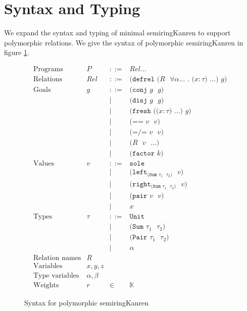 \documentclass{report}
\theoremstyle{definition}
\begin{document}
\section{Syntax and Typing}

We expand the syntax and typing of minimal semiringKanren to support polymorphic relations.
We give the syntax of polymorphic semiringKanren in figure \ref{fig:poly-syntax}.

\begin{figure}
\[
\begin{array}{lrcl}
	\textrm{Programs} & P & ::= & \mathit{Rel}\dots \\
	\textrm{Relations} & Rel & ::= & \texttt{(defrel (\(R\) \(\forall \alpha \dots\) . (\(x:\tau\)) \(\dots\)) \(g\)) } \\
	\textrm{Goals} & g & ::= & \texttt{(conj \(g\) \(g\))} \\
	& & | & \texttt{(disj \(g\) \(g\))} \\
	& & | & \texttt{(fresh ((\(x:\tau\)) \(\dots\)) \(g\))} \\
	& & | & \texttt{(== \(v\) \(v\))} \\
	& & | & \texttt{(=/= \(v\) \(v\))} \\
	& & | & \texttt{(\(R\) \(v\) \(\dots\))} \\
	& & | & \texttt{(factor \(k\))} \\
	\textrm{Values} & v & ::= & \texttt{sole} \\
	& & | & \texttt{(left\(_{\texttt{(Sum \(\tau_1\) \(\tau_2\))}}\) \(v\))} \\
	& & | & \texttt{(right\(_{\texttt{(Sum \(\tau_1\) \(\tau_2\))}}\) \(v\))} \\
	& & | & \texttt{(pair \(v\) \(v\))} \\
	& & | & x \\
	\textrm{Types} & \tau & ::= & \texttt{Unit} \\
	& & | & \texttt{(Sum \(\tau_1\) \(\tau_2\))} \\
	& & | & \texttt{(Pair \(\tau_1\) \(\tau_2\))} \\
	& & | & \alpha \\
	\textrm{Relation names} & R & & \\
	\textrm{Variables} & x,y,z & & \\
	\textrm{Type variables} & \alpha,\beta & & \\
	\textrm{Weights} & r & \in & \mathbb{K}
\end{array}
\]
\caption{Syntax for polymorphic semiringKanren}
\label{fig:poly-syntax}
\end{figure}
\end{document}
